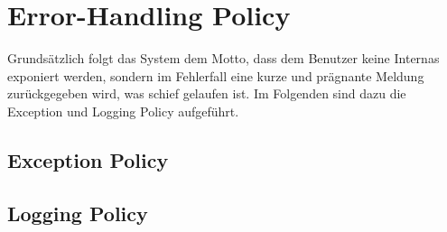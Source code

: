 
\section{Error-Handling Policy}
\label{Error-Handling Policy}

Grundsätzlich folgt das System dem Motto, dass dem Benutzer keine Internas exponiert werden, sondern im Fehlerfall eine kurze und prägnante Meldung zurückgegeben wird, was schief gelaufen ist. Im Folgenden sind dazu die Exception und Logging Policy aufgeführt.

\subsection{Exception Policy}
\label{EHP:Exception Policy}


\subsection{Logging Policy}
\label{EHP:Logging Policy}

